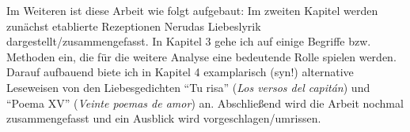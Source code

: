 \begin{comment}
  * literatur/sprache shape our minds
  * wachsamkeit/Sensibilität schaffen fürs Erkennen patriarchalischen Projekte, die mittels "universelle Gefühle", "schöne Liebeslyrik" vermittelt werden/dafür verkauft werden

  immer noch zu schwammig..

  [Kolodny1980]
  Feminist Readings of male authors: discovering/exposing power relations men-women, that are taken for natural and granted


\end{comment}


Im Weiteren ist diese Arbeit wie folgt aufgebaut:
Im zweiten Kapitel werden zunächst etablierte Rezeptionen Nerudas Liebeslyrik dargestellt/zusammengefasst.
In Kapitel 3 gehe ich auf einige Begriffe bzw. Methoden ein, die für die weitere Analyse eine bedeutende Rolle spielen werden.
Darauf aufbauend biete ich in Kapitel 4 examplarisch (syn!) alternative Leseweisen von den Liebesgedichten ``Tu risa'' (\textit{Los versos del capitán}) und ``Poema XV'' (\textit{Veinte poemas de amor}) an.
Abschließend wird die Arbeit nochmal zusammengefasst und ein Ausblick wird vorgeschlagen/umrissen.


